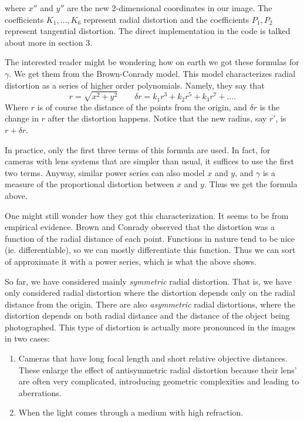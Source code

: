 \documentclass{article}
\begin{document}
where $x''$ and $y''$ are the new 2-dimensional coordinates in our image. The coefficients $K_1, \ldots, K_6$ represent radial distortion and the coefficients $P_1, P_2$ represent tangential distortion. The direct implementation in the code is talked about more in section 3. 

The interested reader might be wondering how on earth we got these formulas for $\gamma$. We get them from the Brown-Conrady model. This model characterizes radial distortion as a series of higher order polynomials. Namely, they say that 
\[
r = \sqrt{x^2 + y^2} \qquad \delta r = k_1r^3 + k_2r^5 + k_3r^7 + \ldots 
.\] Where $r$ is of course the distance of the points from the origin, and $\delta r$ is the change in $r$ after the distortion happens. Notice that the new radius, say $r'$, is $r+\delta r$.

In practice, only the first three terms of this formula are used. In fact, for cameras with lens systems that are simpler than usual, it suffices to use the first two terms. Anyway, similar power series can also model $x$ and $y$, and $\gamma$ is a measure of the proportional distortion between $x$ and $y$. Thus we get the formula above. 

One might still wonder how they got this characterization. It seems to be from empirical evidence. Brown and Conrady observed that the distortion was a function of the radial distance of each point. Functions in nature tend to be nice (ie. differentiable), so we can mostly differentiate this function. Thus we can sort of approximate it with a power series, which is what the above shows. 

So far, we have considered mainly \textit{symmetric} radial distortion. That is, we have only considered radial distortion where the distortion depends only on the radial distance from the origin. There are also \textit{asymmetric} radial distortions, where the distortion depends on both radial distance and the distance of the object being photographed. This type of distortion is actually more pronounced in the images in two cases:
\begin{enumerate}
    \item Cameras that have long focal length and short relative objective distances. These enlarge the effect of antisymmetric radial distortion because their lens' are often very complicated, introducing geometric complexities and leading to aberrations. 
    \item When the light comes through a medium with high refraction. 
\end{enumerate}
\end{document}
